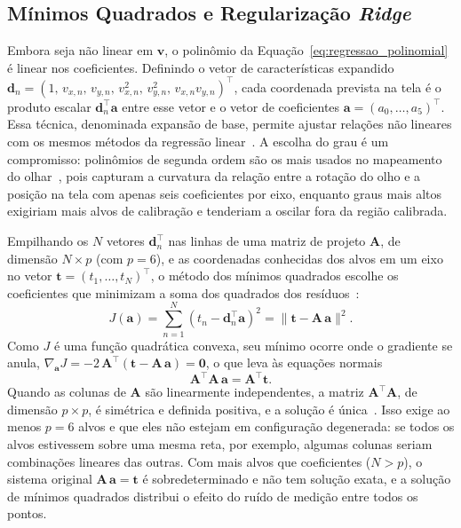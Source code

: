 \subsection{Mínimos Quadrados e Regularização \textit{Ridge}} \label{sec:minimos_quadrados}

Embora seja não linear em $\mathbf{v}$, o polinômio da Equação~\ref{eq:regressao_polinomial} é linear nos coeficientes. Definindo o vetor de características expandido $\mathbf{d}_n = (1,\, v_{x,n},\, v_{y,n},\, v_{x,n}^2,\, v_{y,n}^2,\, v_{x,n}v_{y,n})^\top$, cada coordenada prevista na tela é o produto escalar $\mathbf{d}_n^\top \mathbf{a}$ entre esse vetor e o vetor de coeficientes $\mathbf{a} = (a_0, \ldots, a_5)^\top$. Essa técnica, denominada expansão de base, permite ajustar relações não lineares com os mesmos métodos da regressão linear~\cite{hastie2009elements}. A escolha do grau é um compromisso: polinômios de segunda ordem são os mais usados no mapeamento do olhar~\cite{hansen2010in}, pois capturam a curvatura da relação entre a rotação do olho e a posição na tela com apenas seis coeficientes por eixo, enquanto graus mais altos exigiriam mais alvos de calibração e tenderiam a oscilar fora da região calibrada.

Empilhando os $N$ vetores $\mathbf{d}_n^\top$ nas linhas de uma matriz de projeto $\mathbf{A}$, de dimensão $N \times p$ (com $p = 6$), e as coordenadas conhecidas dos alvos em um eixo no vetor $\mathbf{t} = (t_1, \ldots, t_N)^\top$, o método dos mínimos quadrados escolhe os coeficientes que minimizam a soma dos quadrados dos resíduos~\cite{hastie2009elements}:
\begin{equation}
    J(\mathbf{a}) = \sum_{n=1}^{N} \left(t_n - \mathbf{d}_n^\top \mathbf{a}\right)^2 = \lVert \mathbf{t} - \mathbf{A}\,\mathbf{a} \rVert^2.
    \label{eq:mq}
\end{equation}
Como $J$ é uma função quadrática convexa, seu mínimo ocorre onde o gradiente se anula, $\nabla_{\mathbf{a}} J = -2\,\mathbf{A}^\top(\mathbf{t} - \mathbf{A}\,\mathbf{a}) = \mathbf{0}$, o que leva às equações normais
\begin{equation}
    \mathbf{A}^\top \mathbf{A}\,\mathbf{a} = \mathbf{A}^\top \mathbf{t}.
    \label{eq:normais}
\end{equation}
Quando as colunas de $\mathbf{A}$ são linearmente independentes, a matriz $\mathbf{A}^\top\mathbf{A}$, de dimensão $p \times p$, é simétrica e definida positiva, e a solução é única~\cite{golub2013matrix}. Isso exige ao menos $p = 6$ alvos e que eles não estejam em configuração degenerada: se todos os alvos estivessem sobre uma mesma reta, por exemplo, algumas colunas seriam combinações lineares das outras. Com mais alvos que coeficientes ($N > p$), o sistema original $\mathbf{A}\,\mathbf{a} = \mathbf{t}$ é sobredeterminado e não tem solução exata, e a solução de mínimos quadrados distribui o efeito do ruído de medição entre todos os pontos.

